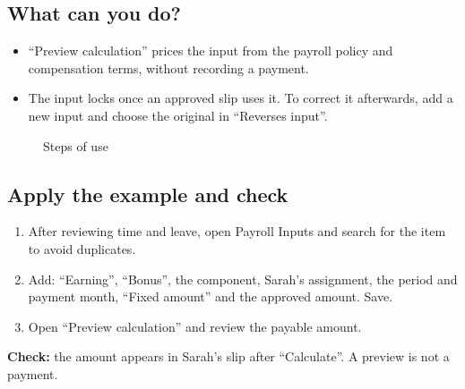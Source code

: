 \subsection{What can you do?}

\begin{itemize}
  \item “Preview calculation” prices the input from the payroll policy and compensation terms, without recording a payment.
  \item The input locks once an approved slip uses it. To correct it afterwards, add a new input and choose the original in “Reverses input”.
\end{itemize}

\begin{figure}[H]
\centering
{}
\rclegend
\caption{Steps of use}
\label{fig:hr-feature-payroll-inputs-flow}
\end{figure}

\subsection{Apply the example and check}

\begin{enumerate}
  \item After reviewing time and leave, open Payroll Inputs and search for the item to avoid duplicates.
  \item Add: “Earning”, “Bonus”, the component, Sarah's assignment, the period and payment month, “Fixed amount” and the approved amount. Save.
  \item Open “Preview calculation” and review the payable amount.
\end{enumerate}

\textbf{Check:} the amount appears in Sarah's slip after “Calculate”. A preview is not a payment.

